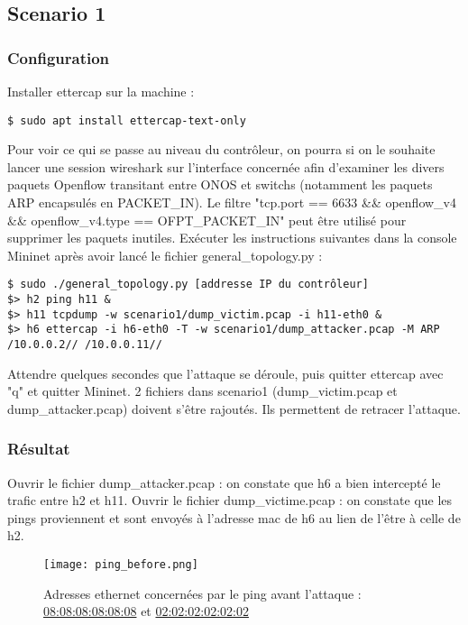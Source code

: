 \subsection{Scenario 1}

\subsubsection{Configuration}

Installer ettercap sur la machine :
\begin{verbatim}
$ sudo apt install ettercap-text-only
\end{verbatim}

Pour voir ce qui se passe au niveau du contrôleur, on pourra si on le souhaite lancer une session wireshark sur l'interface concernée afin d'examiner les divers paquets Openflow transitant entre ONOS et switchs (notamment les paquets ARP encapsulés en PACKET\_IN). Le filtre "tcp.port == 6633 \&\& openflow\_v4 \&\& openflow\_v4.type == OFPT\_PACKET\_IN" peut être utilisé pour supprimer les paquets inutiles.
Exécuter les instructions suivantes dans la console Mininet après avoir lancé le fichier general\_topology.py :

\begin{verbatim}
$ sudo ./general_topology.py [addresse IP du contrôleur]
$> h2 ping h11 &
$> h11 tcpdump -w scenario1/dump_victim.pcap -i h11-eth0 &
$> h6 ettercap -i h6-eth0 -T -w scenario1/dump_attacker.pcap -M ARP
/10.0.0.2// /10.0.0.11//
\end{verbatim}

Attendre quelques secondes que l'attaque se déroule, puis quitter ettercap avec "q" et quitter Mininet. 2 fichiers dans scenario1 (dump\_victim.pcap et dump\_attacker.pcap) doivent s'être rajoutés. Ils permettent de retracer l'attaque.

\subsubsection{Résultat}

Ouvrir le fichier dump\_attacker.pcap : on constate que h6 a bien intercepté le trafic entre h2 et h11.
Ouvrir le fichier dump\_victime.pcap : on constate que les pings proviennent et sont envoyés à l'adresse mac de h6 au lien de l'être à celle de h2.\\

\begin{figure}[h]
  	\centering
  	\texttt{[image: ping\_before.png]}
  	\caption{Adresses ethernet concernées par le ping avant l'attaque : \url{08:08:08:08:08:08} et \url{02:02:02:02:02:02}}
\end{figure}

